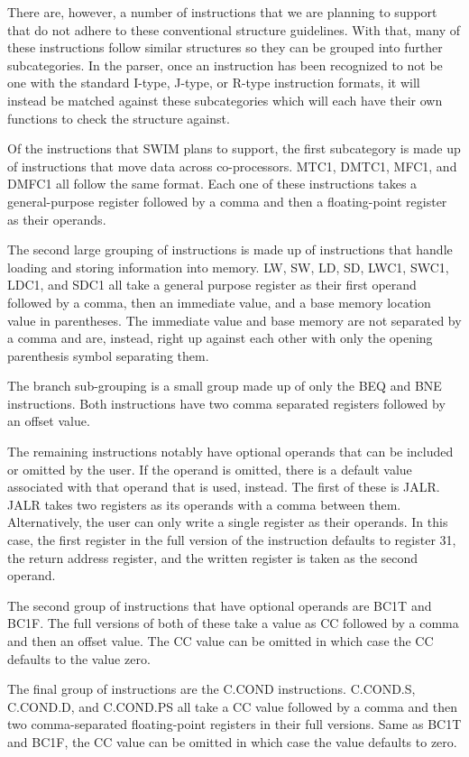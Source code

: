 \documentclass[
    paper=letter,
    parskip=half,
    fontsize=12pt,
    titlepage=firstiscover,
    toc=bibliography,
    numbers=endperiod
]{scrartcl}
\begin{document}
There are, however, a number of instructions that we are planning to
support that do not adhere to these conventional structure guidelines.
With that, many of these instructions follow similar structures so they
can be grouped into further subcategories. In the parser, once an
instruction has been recognized to not be one with the standard I-type,
J-type, or R-type instruction formats, it will instead be matched
against these subcategories which will each have their own functions to
check the structure against.

Of the instructions that SWIM plans to support, the first
subcategory is made up of instructions that move data across
co-processors. MTC1, DMTC1, MFC1, and DMFC1 all follow the same format.
Each one of these instructions takes a general-purpose register followed
by a comma and then a floating-point register as their operands.

The second large grouping of instructions is made up of instructions
that handle loading and storing information into memory. LW, SW, LD, SD,
LWC1, SWC1, LDC1, and SDC1 all take a general purpose register as their
first operand followed by a comma, then an immediate value, and a base
memory location value in parentheses. The immediate value and base
memory are not separated by a comma and are, instead, right up against
each other with only the opening parenthesis symbol separating them.

The branch sub-grouping is a small group made up of only the BEQ and BNE
instructions. Both instructions have two comma separated registers
followed by an offset value.

The remaining instructions notably have optional operands that can be
included or omitted by the user. If the operand is omitted, there is a
default value associated with that operand that is used, instead. The
first of these is JALR. JALR takes two registers as its operands with a
comma between them. Alternatively, the user can only write a single
register as their operands. In this case, the first register in the full
version of the instruction defaults to register 31, the return address
register, and the written register is taken as the second operand.

The second group of instructions that have optional operands are BC1T
and BC1F. The full versions of both of these take a value as CC followed
by a comma and then an offset value. The CC value can be omitted in
which case the CC defaults to the value zero.

The final group of instructions are the C.COND instructions. C.COND.S,
C.COND.D, and C.COND.PS all take a CC value followed by a comma and then
two comma-separated floating-point registers in their full versions.
Same as BC1T and BC1F, the CC value can be omitted in which case the
value defaults to zero.
\end{document}
